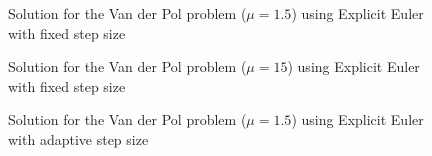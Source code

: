 \begin{figure}[H]
    \centering
    \caption{Solution for the Van der Pol problem ($\mathit{\mu = 1.5}$) using Explicit Euler with fixed step size}
    \label{2_4_fixed_mu_1_5}
\end{figure}

\begin{figure}[H]
    \centering
    \caption{Solution for the Van der Pol problem ($\mathit{\mu = 15}$) using Explicit Euler with fixed step size}
    \label{2_4_fixed_mu_15}
\end{figure}

\begin{figure}[H]
    \centering
    \caption{Solution for the Van der Pol problem ($\mathit{\mu = 1.5}$) using Explicit Euler with adaptive step size}
    \label{2_4_adaptive_mu_1_5}
\end{figure}

